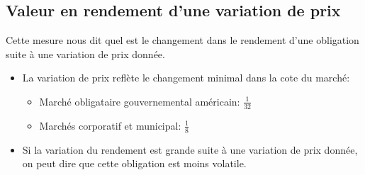 \documentclass[letterpaper, 12pt]{article}
\newcommand{\1}{\mathds{1}}	%
\theoremstyle{definition}
\begin{document}
\subsection{Valeur en rendement d’une variation de prix}
Cette mesure nous dit quel est le changement dans le rendement d'une obligation suite à une variation de prix donnée.  
\begin{itemize}
\item La variation de prix reflète le changement minimal dans la cote du marché: 
\begin{itemize}
\item Marché obligataire gouvernemental américain: $\frac{1}{32}$
\item Marchés corporatif et municipal: $\frac{1}{8}$
\end{itemize}
\item Si la variation du rendement est grande suite à une variation de prix donnée, on peut dire que cette obligation est moins volatile.
\end{itemize}
\end{document}
